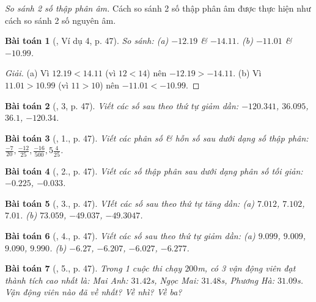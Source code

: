 \documentclass{article}
\newtheorem{baitoan}{Bài toán}
\begin{document}
\textit{So sánh 2 số thập phân âm.} Cách so sánh 2 số thập phân âm được thực hiện như cách so sánh 2 số nguyên âm.

\begin{baitoan}[\cite{SGK_Toan_6_Canh_Dieu_tap_2}, Ví dụ 4, p. 47]
	So sánh: (a) $-12.19$ \& $-14.11$. (b) $-11.01$ \& $-10.99$.
\end{baitoan}

\begin{proof}[Giải]
	(a) Vì $12.19 < 14.11$ (vì $12 < 14$) nên $-12.19 > -14.11$. (b) Vì $11.01 > 10.99$ (vì $11 > 10$) nên $-11.01 < -10.99$.
\end{proof}

\begin{baitoan}[\cite{SGK_Toan_6_Canh_Dieu_tap_2}, 3, p. 47]
	Viết các số sau theo thứ tự giảm dần: $-120.341$, $36.095$, $36.1$, $-120.34$.
\end{baitoan}

\begin{baitoan}[\cite{SGK_Toan_6_Canh_Dieu_tap_2}, 1., p. 47]
	Viết các phân số \& hỗn số sau dưới dạng số thập phân: $\frac{-7}{20},\frac{-12}{25},\frac{-16}{500},5\frac{4}{25}$.
\end{baitoan}

\begin{baitoan}[\cite{SGK_Toan_6_Canh_Dieu_tap_2}, 2., p. 47]
	Viết các số thập phân sau dưới dạng phân số tối giản: $-0.225$, $-0.033$.
\end{baitoan}

\begin{baitoan}[\cite{SGK_Toan_6_Canh_Dieu_tap_2}, 3., p. 47]
	VIết các số sau theo thứ tự tăng dần: (a) $7.012$, $7.102$, $7.01$. (b) $73.059$, $-49.037$, $-49.3047$.
\end{baitoan}

\begin{baitoan}[\cite{SGK_Toan_6_Canh_Dieu_tap_2}, 4., p. 47]
	Viết các số sau theo thứ tự giảm dần: (a) $9.099$, $9.009$, $9.090$, $9.990$. (b) $-6.27$, $-6.207$, $-6.027$, $-6.277$.
\end{baitoan}

\begin{baitoan}[\cite{SGK_Toan_6_Canh_Dieu_tap_2}, 5., p. 47]
	Trong 1 cuộc thi chạy $200$\emph{m}, có 3 vận động viên đạt thành tích cao nhất là: Mai Anh: $31.42$\emph{s}, Ngọc Mai: $31.48$\emph{s}, Phương Hà: $31.09$\emph{s}. Vận động viên nào đã về nhất? Về nhì? Về ba?
\end{baitoan}

\end{document}
